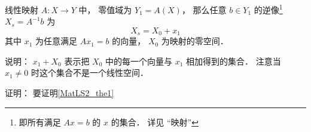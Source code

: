 

\begin{theorem}{}
线性映射 $A:X\to Y$ 中， 零值域为 $Y_1 = A(X)$， 那么任意 $b \in Y_1$ 的逆像\footnote{即所有满足 $Ax = b$ 的 $x$ 的集合． 详见 “映射”} $X_s = A^{-1}b$ 为
\begin{equation}
X_s = X_0 + x_1
\end{equation}
其中 $x_1$ 为任意满足 $Ax_1 = b$ 的向量，  $X_0$ 为映射的零空间．
\end{theorem}
说明： $x_1 + X_0$ 表示把 $X_0$ 中的每一个向量与 $x_1$ 相加得到的集合． 注意当 $x_1 \ne 0$ 时这个集合不是一个线性空间．

证明： 要证明\autoref{MatLS2_the1}~
